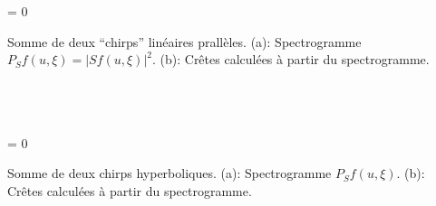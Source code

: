 \vspace{0cm}\setlength{\tabcolsep}{0cm} %
\setlength{\fboxsep}{0cm} %
\avecboite = 0
\begin{figtab}
\begin{figrow}{4}
{{\label{WFTLinChirps} 
Somme de deux ``chirps'' lin\'{e}aires prall\`{e}les.
(a): Spectrogramme $P_S f(u,\xi)=|Sf(u,\xi)|^2$.
(b): Cr\^{e}tes calcul\'{e}es \`{a} partir du spectrogramme.  
}}\\
\\

\\

\\

\end{figrow} 
\end{figtab}

\vspace{0cm}\setlength{\tabcolsep}{0cm} %
\setlength{\fboxsep}{0cm} %
\avecboite = 0
\begin{figtab}
\begin{figrow}{4}
{{\label{WFTHypChirps}
Somme de deux chirps hyperboliques.
(a): Spectrogramme $P_S f(u,\xi)$.
(b): Cr\^{e}tes calcul\'{e}es \`{a} partir du spectrogramme.  
}}\\
\\

\\

\\

\end{figrow} 
\end{figtab}


